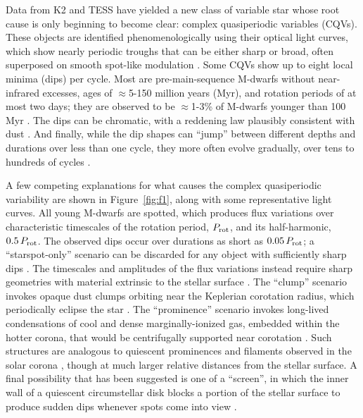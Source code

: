 \documentclass[11pt,twocolumn,tighten]{aastex63}
\begin{document}
Data from K2 and TESS have yielded a new class of variable star whose
root cause is only beginning to become clear: complex quasiperiodic
variables (CQVs).  These objects are identified phenomenologically
using their optical light curves, which show nearly periodic troughs
that can be either sharp or broad, often superposed on smooth
spot-like modulation
\citep{2017AJ....153..152S,2018AJ....155...63S,2019ApJ...876..127Z}.
Some CQVs show up to eight local minima (dips) per cycle.  Most are
pre-main-sequence M-dwarfs without near-infrared excesses, ages of
$\approx$5-150 million years (Myr), and rotation periods of at most
two days; they are observed to be $\approx$1-3\% of M-dwarfs younger
than 100 Myr \citep{2016AJ....152..114R,2022AJ....163..144G}.  The
dips can be chromatic, with a reddening law plausibly consistent with
dust
\citep{2020AJ....160...86B,2022AJ....163..144G,2023MNRAS.518.2921K}.
And finally, while the dip shapes can ``jump'' between different
depths and durations over less than one cycle, they more often evolve
gradually, over tens to hundreds of cycles
\citep[e.g.][]{2017AJ....153..152S,2022ApJ...925...75P,2023ApJ...945..114P}.

A few competing explanations for what causes the complex quasiperiodic
variability are shown in Figure~\ref{fig:f1}, along with some
representative light curves.  All young M-dwarfs are spotted, which
produces flux variations over characteristic timescales of the
rotation period, $P_{\rm rot}$, and its half-harmonic, $0.5\,P_{\rm
rot}$.  The observed dips occur over durations as short as
$0.05\,P_{\rm rot}$; a ``starspot-only'' scenario can be discarded for
any object with sufficiently sharp dips
\citep{2017AJ....153..152S,2021MNRAS.500.1366K}.   The timescales and
amplitudes of the flux variations instead require sharp geometries
with material extrinsic to the stellar surface
\citep[e.g.][]{2017AJ....153..152S,2022AJ....163..144G}.  The
``clump'' scenario invokes opaque dust clumps orbiting near the
Keplerian corotation radius, which periodically eclipse the star
\citep{2017AJ....153..152S,2023MNRAS.518.4734S}.  The ``prominence''
scenario invokes long-lived condensations of cool and dense
marginally-ionized gas, embedded within the hotter corona, that would
be centrifugally supported near corotation
\citep{1989MNRAS.238..657C,2019MNRAS.482.2853J,2022MNRAS.514.5465W}.
Such structures are analogous to quiescent prominences and filaments
observed in the solar corona \citep[see e.g.][]{2015ASSL..415.....V},
though at much larger relative distances from the stellar surface.  A
final possibility that has been suggested is one of a ``screen'', in
which the inner wall of a quiescent circumstellar disk blocks a
portion of the stellar surface to produce sudden dips whenever spots
come into view \citep{2019ApJ...876..127Z}.  
\end{document}
